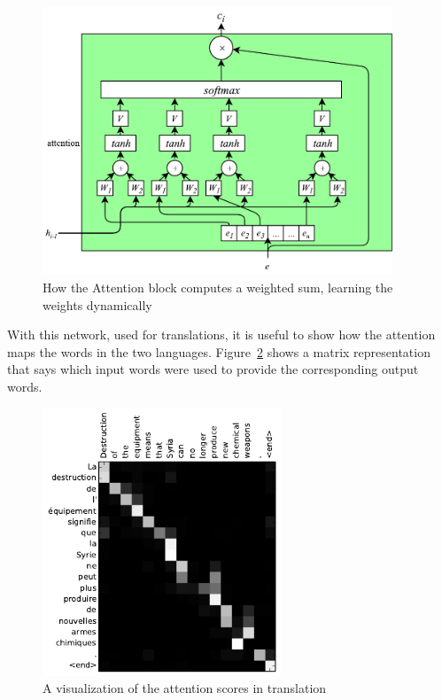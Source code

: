 \begin{figure}[!htbp]
    \centering
    \includegraphics[max width=\linewidth,max height=8cm,keepaspectratio]{figures/attention}
    \caption{How the Attention block computes a weighted sum, learning the weights dynamically}\label{fig:attention}
\end{figure}

With this network, used for translations, it is useful to show how the attention maps the words in the two languages. Figure~\ref{fig:attentionVisualization} shows a matrix representation that says which input words were used to provide the corresponding output words.


\begin{figure}[!htbp]
    \centering
    \includegraphics[max width=\linewidth,max height=8cm,keepaspectratio]{figures/attentionVisualization}
    \caption{A visualization of the attention scores in translation~\cite{bahdanau2014neural}}\label{fig:attentionVisualization}
\end{figure}

